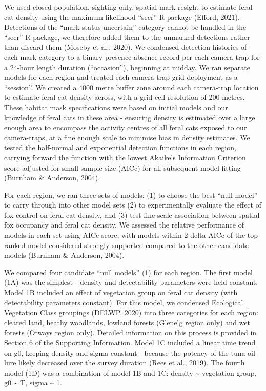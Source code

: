 \documentclass[]{elsarticle} %
\begin{document}
We used closed population, sighting-only, spatial mark-resight to estimate feral cat density using the maximum likelihood ``secr'' R package (Efford, 2021). Detections of the ``mark status uncertain'' category cannot be handled in the ``secr'' R package, we therefore added them to the unmarked detections rather than discard them (Moseby et al., 2020). We condensed detection histories of each mark category to a binary presence-absence record per each camera-trap for a 24-hour length duration (``occasion''), beginning at midday. We ran separate models for each region and treated each camera-trap grid deployment as a ``session''. We created a 4000 metre buffer zone around each camera-trap location to estimate feral cat density across, with a grid cell resolution of 200 metres. These habitat mask specifications were based on initial models and our knowledge of feral cats in these area - ensuring density is estimated over a large enough area to encompass the activity centres of all feral cats exposed to our camera-traps, at a fine enough scale to minimise bias in density estimates. We tested the half-normal and exponential detection functions in each region, carrying forward the function with the lowest Akaike's Information Criterion score adjusted for small sample size (AICc) for all subsequent model fitting (Burnham \& Anderson, 2004).

For each region, we ran three sets of models: (1) to choose the best ``null model'' to carry through into other model sets (2) to experimentally evaluate the effect of fox control on feral cat density, and (3) test fine-scale association between spatial fox occupancy and feral cat density. We assessed the relative performance of models in each set using AICc score, with models within 2 delta AICc of the top-ranked model considered strongly supported compared to the other candidate models (Burnham \& Anderson, 2004).

We compared four candidate ``null models'' (1) for each region. The first model (1A) was the simplest - density and detectability parameters were held constant.
Model 1B included an effect of vegetation group on feral cat density (with detectability parameters constant). For this model, we condensed Ecological Vegetation Class groupings (DELWP, 2020) into three categories for each region: cleared land, heathy woodlands, lowland forests (Glenelg region only) and wet forests (Otways region only). Detailed information on this process is provided in Section 6 of the Supporting Information. Model 1C included a linear time trend on g0, keeping density and sigma constant - because the potency of the tuna oil lure likely decreased over the survey duration (Rees et al., 2019). The fourth model (1D) was a combination of model 1B and 1C: density \textasciitilde{} vegetation group, g0 \textasciitilde{} T, sigma \textasciitilde{} 1.
\end{document}
